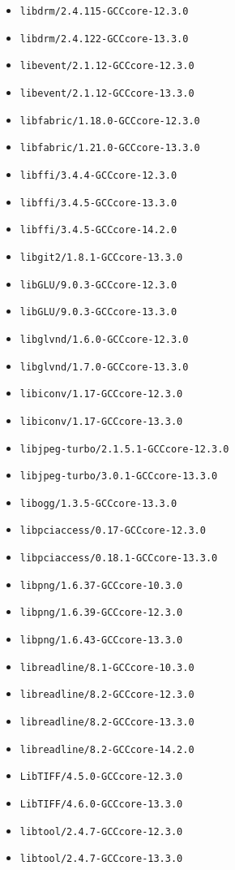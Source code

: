 \begin{multicols}{3}
\begin{itemize}
\item \verb|libdrm/2.4.115-GCCcore-12.3.0|
\item \verb|libdrm/2.4.122-GCCcore-13.3.0|
\item \verb|libevent/2.1.12-GCCcore-12.3.0|
\item \verb|libevent/2.1.12-GCCcore-13.3.0|
\item \verb|libfabric/1.18.0-GCCcore-12.3.0|
\item \verb|libfabric/1.21.0-GCCcore-13.3.0|
\item \verb|libffi/3.4.4-GCCcore-12.3.0|
\item \verb|libffi/3.4.5-GCCcore-13.3.0|
\item \verb|libffi/3.4.5-GCCcore-14.2.0|
\item \verb|libgit2/1.8.1-GCCcore-13.3.0|
\item \verb|libGLU/9.0.3-GCCcore-12.3.0|
\item \verb|libGLU/9.0.3-GCCcore-13.3.0|
\item \verb|libglvnd/1.6.0-GCCcore-12.3.0|
\item \verb|libglvnd/1.7.0-GCCcore-13.3.0|
\item \verb|libiconv/1.17-GCCcore-12.3.0|
\item \verb|libiconv/1.17-GCCcore-13.3.0|
\item \verb|libjpeg-turbo/2.1.5.1-GCCcore-12.3.0|
\item \verb|libjpeg-turbo/3.0.1-GCCcore-13.3.0|
\item \verb|libogg/1.3.5-GCCcore-13.3.0|
\item \verb|libpciaccess/0.17-GCCcore-12.3.0|
\item \verb|libpciaccess/0.18.1-GCCcore-13.3.0|
\item \verb|libpng/1.6.37-GCCcore-10.3.0|
\item \verb|libpng/1.6.39-GCCcore-12.3.0|
\item \verb|libpng/1.6.43-GCCcore-13.3.0|
\item \verb|libreadline/8.1-GCCcore-10.3.0|
\item \verb|libreadline/8.2-GCCcore-12.3.0|
\item \verb|libreadline/8.2-GCCcore-13.3.0|
\item \verb|libreadline/8.2-GCCcore-14.2.0|
\item \verb|LibTIFF/4.5.0-GCCcore-12.3.0|
\item \verb|LibTIFF/4.6.0-GCCcore-13.3.0|
\item \verb|libtool/2.4.7-GCCcore-12.3.0|
\item \verb|libtool/2.4.7-GCCcore-13.3.0|

\end{itemize}
\end{multicols}
